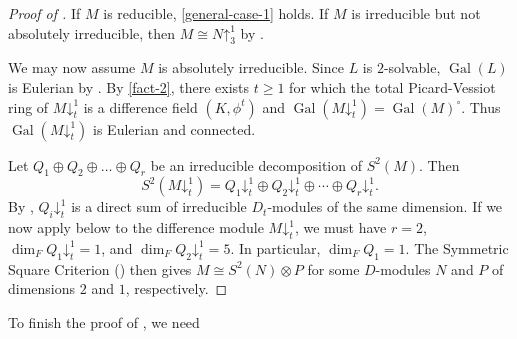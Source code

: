 \documentclass[11pt,reqno]{amsart}
\theoremstyle{definition}
\DeclareMathOperator{\Gal}{Gal}
\newcommand{\pda}{\mathord{\downarrow}}
\newcommand{\pua}{\mathord{\uparrow}}
\begin{document}
\begin{proof}[Proof of ]
    If $M$ is reducible, \eqref{general-case-1} holds. 
    If $M$ is irreducible but not absolutely irreducible,
    then $M \cong N\pua^{1}_{3}$ by .
    
    We may now assume $M$ is absolutely irreducible.
    Since $L$ is $2$-solvable, $\Gal(L)$ is Eulerian
    by . 
    By  \eqref{fact-2}, there exists $t\ge 1$ for which the total Picard-Vessiot ring of $M\pda^{1}_{t}$ is a difference field $(K,\phi^{t})$ and $\Gal(M\pda^{1}_{t})=\Gal(M)^{\circ}$.
    Thus $\Gal (M\pda_{t}^{1})$ is Eulerian and connected.
    
    Let $Q_{1}\oplus Q_{2}\oplus\dots\oplus Q_{r}$ be an irreducible decomposition of $S^{2}(M)$. Then
    \[
        S^{2}(M\pda_{t}^{1}) = Q_{1}\pda^{1}_{t}\oplus Q_{2}\pda^{1}_{t}\oplus \cdots\oplus Q_{r}\pda^{1}_{t}.
    \]
    By , $Q_{i}\pda^{1}_{t}$ is a direct sum of irreducible $D_{t}$-modules of the same dimension. 
    If we now apply  below to the difference module $M\pda^1_t$, we must have $r=2$, $\dim_{F} Q_{1}\pda^{1}_{t} = 1$, and $\dim_{F} Q_{2}\pda^{1}_{t} = 5$. 
    In particular, $\dim_{F} Q_{1}=1$.
    The Symmetric Square Criterion () then gives $M\cong S^{2}(N)\otimes P$ for some $D$-modules $N$ and $P$ of dimensions $2$ and $1$, respectively.
\end{proof}

To finish the proof of , we need
\end{document}
